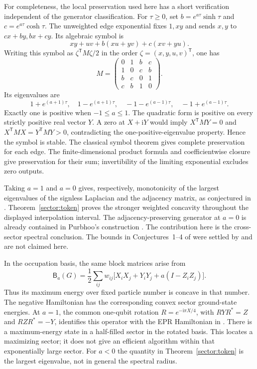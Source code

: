 \documentclass[reqno]{amsart}
\theoremstyle{definition}
\theoremstyle{remark}
\begin{document}
For completeness, the local preservation used here has a short
verification independent of the generator classification. For
\(\tau\ge0\), set \(b=e^{a\tau}\sinh\tau\) and
\(c=e^{a\tau}\cosh\tau\). The unweighted edge exponential fixes
\(1,xy\) and sends \(x,y\) to \(cx+by,bx+cy\).
Its algebraic symbol is
\[
 xy+uv+b(xu+yv)+c(xv+yu).
\]
Writing this symbol as \(\zeta^{\mathsf T}M\zeta/2\) in the
order \(\zeta=(x,y,u,v)^{\mathsf T}\), one has
\[
 M=\begin{pmatrix}
 0&1&b&c\\
 1&0&c&b\\
 b&c&0&1\\
 c&b&1&0
 \end{pmatrix}.
\]
Its eigenvalues are
\[
 1+e^{(a+1)\tau},\quad 1-e^{(a+1)\tau},\quad
 -1-e^{(a-1)\tau},\quad -1+e^{(a-1)\tau}.
\]
Exactly one is positive when \(-1\le a\le1\). The quadratic
form is positive on every strictly positive real vector \(Y\).
A zero at \(X+\mathrm iY\) would imply
\(X^{\mathsf T}MY=0\) and
\(X^{\mathsf T}MX=Y^{\mathsf T}MY>0\), contradicting the
one-positive-eigenvalue property. Hence the symbol is stable.
The classical symbol theorem \cite{BB09} gives complete
preservation for each edge. The finite-dimensional product formula
and coefficientwise closure give preservation for their sum;
invertibility of the limiting exponential excludes zero outputs.

Taking \(a=1\) and \(a=0\) gives, respectively, monotonicity of
the largest eigenvalues of the signless Laplacian and the adjacency
matrix, as conjectured in \cite[Conjectures~5--6]{APS26}.
Theorem~\ref{sector:token} proves the stronger weighted concavity
throughout the displayed interpolation interval.
The adjacency-preserving generator at \(a=0\) is already contained
in Purbhoo's construction \cite[Proposition~4.5]{Purbhoo18}.
The contribution here is the cross-sector spectral conclusion.
The bounds in Conjectures~1--4 of \cite{APS26} were settled by
\cite{BBKL26} and are not claimed here.

In the occupation basis, the same block matrices arise from
\[
 \mathsf B_a(G)=\frac12\sum_{ij}w_{ij}
 \bigl[X_iX_j+Y_iY_j+a(I-Z_iZ_j)\bigr].
\]
Thus its maximum energy over fixed particle number is concave in
that number. The negative Hamiltonian has the corresponding convex
sector ground-state energies. At \(a=1\), the common one-qubit
rotation \(R=e^{-\mathrm i\pi X/4}\), with
\(RYR^*=Z\) and \(RZR^*=-Y\), identifies this operator with the
EPR Hamiltonian in \cite{APS26}. There is a
maximum-energy state in a half-filled sector in the rotated basis.
This locates a maximizing sector; it does not give an efficient
algorithm within that exponentially large sector. For \(a<0\)
the quantity in Theorem~\ref{sector:token} is the largest
eigenvalue, not in general the spectral radius.
\end{document}
